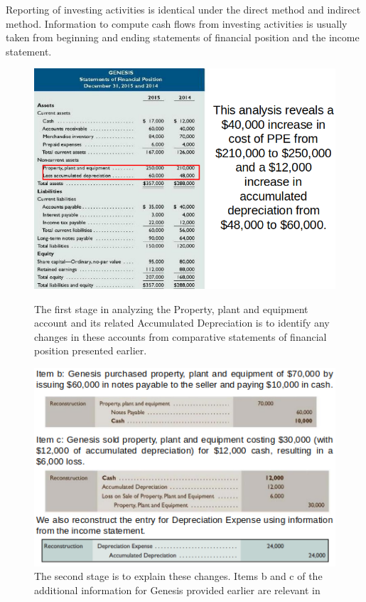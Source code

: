 \documentclass[../main.tex]{subfiles}
\begin{document}
	Reporting of investing activities is identical under the direct method and 
	indirect method. Information to compute cash flows from investing 
	activities is usually taken from beginning and ending statements of 
	financial position and the income statement.

	\begin{figure}[ht!]
		\centering
		\includegraphics[width=1\columnwidth]{images/c11/first_stage_investing.png}
		\caption{The first stage in analyzing the Property, plant and equipment 
		account and its related Accumulated Depreciation is to identify any 
		changes in these accounts from comparative statements of financial 
		position presented earlier.}
		\includegraphics[width=1\columnwidth]{images/c11/investing_cash_flow.png}
		\caption{The second stage is to explain these changes. Items b and c of 
		the additional information for Genesis provided earlier are relevant in 
}
\end{figure}
\end{document}
